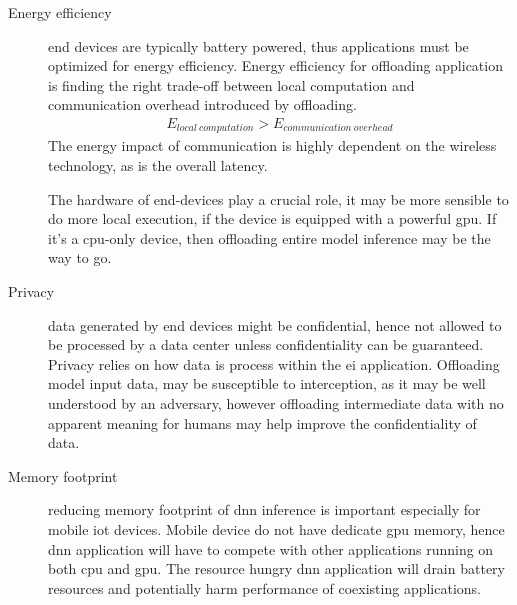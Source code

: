 \begin{description}
	\item[Energy efficiency] end devices are typically battery powered, thus applications must be optimized for energy efficiency. Energy efficiency for offloading application is finding the right trade-off between local computation and communication overhead introduced by offloading. 
	\begin{align*}
	E_{local\: computation} > E_{communication\: overhead}
	\end{align*}
	The energy impact of communication is highly dependent on the wireless technology, as is the overall latency. 
	
	The hardware of end-devices play a crucial role, it may be more sensible to do more local execution, if the device is equipped with a powerful \gls{gpu}. If it's a \gls{cpu}-only device, then offloading entire model inference may be the way to go.
	
	\item[Privacy] data generated by end devices might be confidential, hence not allowed to be processed by a data center unless confidentiality can be guaranteed. Privacy relies on how data is process within the \gls{ei} application. Offloading model input data, may be susceptible to interception, as it may be well understood by an adversary, however offloading intermediate data with no apparent meaning for humans may help improve the confidentiality of data.    
	
	\item[Memory footprint] reducing memory footprint of \gls{dnn} inference is important especially for mobile \gls{iot} devices. Mobile device do not have dedicate \gls{gpu} memory, hence \gls{dnn} application will have to compete with other applications running on both \gls{cpu} and \gls{gpu}. The resource hungry \gls{dnn} application will drain battery resources and potentially harm performance of coexisting applications. 
	

\end{description}
